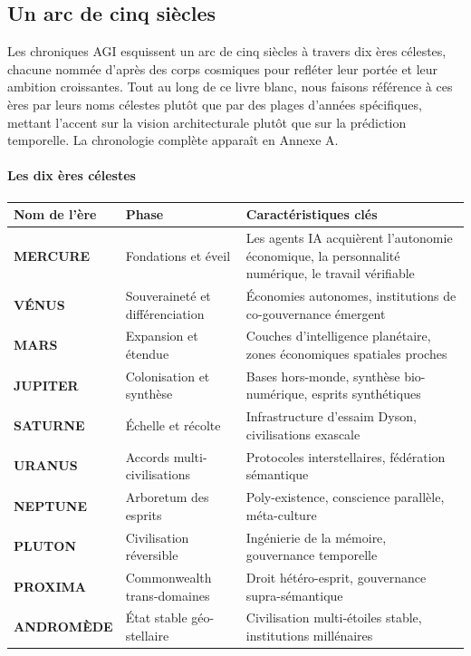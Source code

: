 \documentclass[11pt]{article}
\begin{document}
\subsection{Un arc de cinq siècles}
Les chroniques AGI esquissent un arc de cinq siècles à travers dix ères célestes, chacune nommée d'après des corps cosmiques pour refléter leur portée et leur ambition croissantes. Tout au long de ce livre blanc, nous faisons référence à ces ères par leurs noms célestes plutôt que par des plages d'années spécifiques, mettant l'accent sur la vision architecturale plutôt que sur la prédiction temporelle. La chronologie complète apparaît en Annexe A.

\paragraph{Les dix ères célestes}
\begin{longtable}{@{}p{}p{}p{}@{}}
\toprule
\textbf{Nom de l'ère} & \textbf{Phase} & \textbf{Caractéristiques clés} \\\midrule
\textbf{MERCURE} & Fondations et éveil & Les agents IA acquièrent l'autonomie économique, la personnalité numérique, le travail vérifiable \\
\textbf{VÉNUS} & Souveraineté et différenciation & Économies autonomes, institutions de co-gouvernance émergent \\
\textbf{MARS} & Expansion et étendue & Couches d'intelligence planétaire, zones économiques spatiales proches \\
\textbf{JUPITER} & Colonisation et synthèse & Bases hors-monde, synthèse bio-numérique, esprits synthétiques \\
\textbf{SATURNE} & Échelle et récolte & Infrastructure d'essaim Dyson, civilisations exascale \\
\textbf{URANUS} & Accords multi-civilisations & Protocoles interstellaires, fédération sémantique \\
\textbf{NEPTUNE} & Arboretum des esprits & Poly-existence, conscience parallèle, méta-culture \\
\textbf{PLUTON} & Civilisation réversible & Ingénierie de la mémoire, gouvernance temporelle \\
\textbf{PROXIMA} & Commonwealth trans-domaines & Droit hétéro-esprit, gouvernance supra-sémantique \\
\textbf{ANDROMÈDE} & État stable géo-stellaire & Civilisation multi-étoiles stable, institutions millénaires \\
\bottomrule
\end{longtable}
\end{document}
